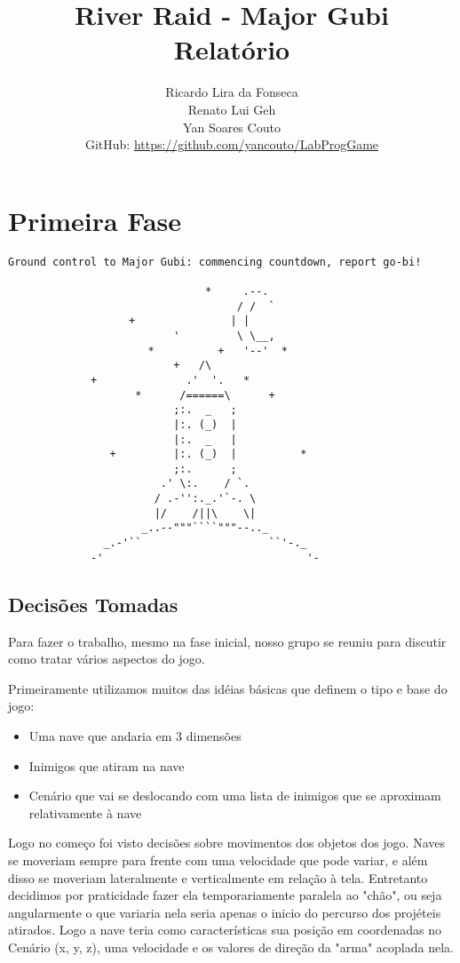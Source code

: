\documentclass[12pt,a4paper]{article}
\title{\vspace{-130pt}
River Raid - Major Gubi \\
		Relatório}
\author{Ricardo Lira da Fonseca\\Renato Lui Geh\\Yan Soares Couto\\GitHub: \url{https://github.com/yancouto/LabProgGame}}
\date{}
\begin{document}
	\maketitle
	\section{Primeira Fase}
	\begin{verbatim}
Ground control to Major Gubi: commencing countdown, report go-bi!

                               *     .--.
                                    / /  `
                   +               | |
                          '         \ \__,
                      *          +   '--'  *
                          +   /\
             +              .'  '.   *
                    *      /======\      +
                          ;:.  _   ;
                          |:. (_)  |
                          |:.  _   |
                +         |:. (_)  |          *
                          ;:.      ;
                        .' \:.    / `.
                       / .-'':._.'`-. \
                       |/    /||\    \|
                     _..--"""````"""--.._
               _.-'``                    ``'-._
             -'                                '-
	\end{verbatim}
		\subsection{Decisões Tomadas}
		Para fazer o trabalho, mesmo na fase inicial, nosso grupo se reuniu para discutir como tratar vários 					aspectos do jogo.
	
	  	Primeiramente utilizamos muitos das idéias básicas que definem o tipo e base do jogo:
	  	\begin{itemize}
	  		\item Uma nave que andaria em 3 dimensões
	  		\item Inimigos que atiram na nave
	  		\item Cenário que vai se deslocando com uma lista de inimigos que se aproximam relativamente à nave
	  	\end{itemize}
	  	Logo no começo foi visto decisões sobre movimentos dos objetos dos jogo. Naves se moveriam
		sempre para frente com uma velocidade que pode variar, e além disso se moveriam lateralmente
		e verticalmente em relação à tela. Entretanto decidimos por praticidade fazer ela temporariamente
		paralela ao "chão", ou seja angularmente o que variaria nela seria apenas o inicio do percurso
		dos projéteis atirados. Logo a nave teria como características sua posição em coordenadas no
		Cenário (x, y, z), uma velocidade e os valores de direção da "arma" acoplada nela.\\
		
\end{document}
